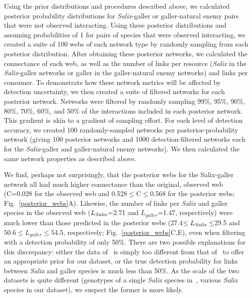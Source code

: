 \documentclass[12pt]{article}
\begin{document}
\begin{spacing}{2.0}
    Using the prior distributions and procedures described above, we calculated posterior probability distributions for \emph{Salix}-galler or galler-natural enemy pairs that were not observed interacting. Using these posterior distributions and assuming probabilities of 1 for pairs of species that were observed interacting, we created a suite of 100 webs of each network type by randomly sampling from each posterior distribution. After obtaining these posterior networks, we calculated the connectance of each web, as well as the number of links per resource (\emph{Salix} in the \emph{Salix}-galler networks or galler in the galler-natural enemy networks) and links per consumer. To demonstrate how these network metrics will be affected by detection uncertainty, we then created a suite of filtered networks for each posterior network. Networks were filtered by randomly sampling 99\%, 95\%, 90\%, 80\%, 70\%, 60\%, and 50\% of the interactions included in each posterior network. This gradient is akin to a gradient of sampling effort. For each level of detection accuracy, we created 100 randomly-sampled networks per posterior-probability network (giving 100 posterior networks and 1000 detection-filtered networks each for the \emph{Salix}-galler and galler-natural enemy networks). We then calculated the same network properties as described above.


    We find, perhaps not surprisingly, that the posterior webs for the Salix-galler network all had much higher connectance than the original, observed web (C=0.028 for the observed web and 0.528$\leq$C$\leq$0.568 for the posterior webs; Fig.~\ref{posterior_webs}A). Likewise, the number of links per \emph{Salix} and galler species in the observed web ($L_{\emph{Salix}}$=2.71 and $L_{galler}$=1.47, respectively) were much lower than those predicted in the posterior webs (27.4$\leq L_{\emph{Salix}} \leq$29.5 and 50.6$\leq L_{galler} \leq $54.5, respectively; Fig.~\ref{posterior_webs}C,E), even when filtering with a detection probability of only 50\%. There are two possible explanations for this discrepancy: either the data of~\citet{Barbour2016} is simply too different from that of~\citet{Kopelke2017} to offer an appropriate prior for our dataset, or the true detection probability for links between \emph{Salix} and galler species is much less than 50\%. As the scale of the two datasets is quite different (genotypes of a single \emph{Salix} species in~\citet{Barbour2016}, various \emph{Salix} species in our dataset), we suspect the former is more likely.


\end{spacing}
\end{document}
